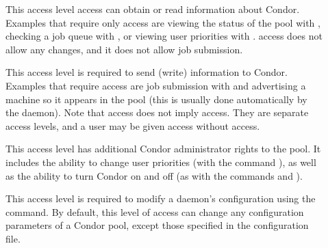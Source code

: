 \begin{description}

\item[] \label{sec-level-read} This access level
   access can obtain or read information about Condor.
   Examples that require only  access are
   viewing the status of the pool with , 
   checking a job queue with ,
   or viewing user priorities with .
    access does not allow any
   changes, and it does not allow job submission.

\item[] \label{sec-level-write} This access level is
   required to send (write) information to Condor. Examples that
   require  access are job submission with
    and advertising a machine so it appears in the pool
   (this is usually done automatically by the  daemon).
   Note that  access does not imply  access.
   They are separate access levels, and a user may be given
    access without  access.

\item[] \label{sec-level-administrator} This
   access level has additional Condor
   administrator rights to the pool.  It includes the ability to
   change user priorities (with the command ),
   as well as the ability to turn Condor on and off
   (as with the commands  and ).

\item[] \label{sec-level-config} This access level is
   required to modify a daemon's configuration using
   the  command.
   By default, this level of access can
   change any configuration parameters of a Condor pool,
   except those specified in
   the  configuration file.



\end{description}
